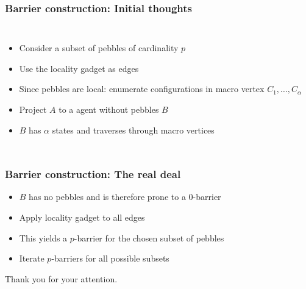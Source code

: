 \documentclass{beamer}
\begin{document}
\begin{frame}
  \frametitle{Barrier construction: Initial thoughts}
  \begin{columns}
    \begin{itemize}
      \item Consider a subset of pebbles of cardinality $p$
      \item Use the locality gadget as edges
      \item Since pebbles are local: enumerate configurations in macro vertex
        $C_{1},\dots,C_{\alpha}$
      \item Project $A$ to a agent without pebbles $B$
      \item $B$ has $\alpha$ states and traverses through macro vertices
    \end{itemize}
    \resizebox{\textwidth}{!}{}
  \end{columns}
\end{frame}

\begin{frame}
  \frametitle{Barrier construction: The real deal}
  \begin{itemize}
    \item $B$ has no pebbles and is therefore prone to a $0$-barrier
    \item Apply locality gadget to all edges
    \item This yields a $p$-barrier for the chosen subset of pebbles
    \item Iterate $p$-barriers for all possible subsets
  \end{itemize}
  \begin{center}
    \resizebox{0.8\textwidth}{!}{}
  \end{center}
\end{frame}

\begin{frame}
  \begin{center}
    \Huge Thank you for your attention.
  \end{center}
\end{frame}
\end{document}
